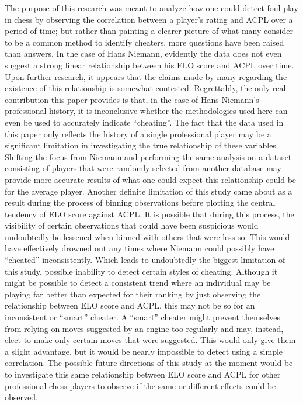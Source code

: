 \documentclass[12pt, letterpaper, titlepage]{article}
\begin{document}
The purpose of this research was meant to analyze how one could detect foul play in chess by observing the correlation between a player's rating and ACPL over a period of time; but rather than painting a clearer picture of what many consider to be a common method to identify cheaters, more questions have been raised than answers. In the case of Hans Niemann, evidently the data does not even suggest a strong linear relationship between his ELO score and ACPL over time. Upon further research, it appears that the claims made by many regarding the existence of this relationship is somewhat contested. Regrettably, the only real contribution this paper provides is that, in the case of Hans Niemann's professional history, it is inconclusive whether the methodologies used here can even be used to accurately indicate “cheating”. The fact that the data used in this paper only reflects the history of a single professional player may be a significant limitation in investigating the true relationship of these variables. Shifting the focus from Niemann and performing the same analysis on a dataset consisting of players that were randomly selected from another database may provide more accurate results of what one could expect this relationship could be for the average player. Another definite limitation of this study came about as a result during the process of binning observations before plotting the central tendency of ELO score against ACPL. It is possible that during this process, the visibility of certain observations that could have been suspicious would undoubtedly be lessened when binned with others that were less so. This would have effectively drowned out any times where Niemann could possibly have “cheated” inconsistently. Which leads to undoubtedly the biggest limitation of this study, possible inability to detect certain styles of cheating. Although it might be possible to detect a consistent trend where an individual may be playing far better than expected for their ranking by just observing the relationship between ELO score and ACPL, this may not be so for an inconsistent or “smart” cheater\citep{chessbot}. A “smart” cheater might prevent themselves from relying on moves suggested by an engine too regularly and may, instead, elect to make only certain moves that were suggested. This would only give them a slight advantage, but it would be nearly impossible to detect using a simple correlation. The possible future directions of this study at the moment would be to investigate this same relationship between ELO score and ACPL for other professional chess players to observe if the same or different effects could be observed.
\end{document}
